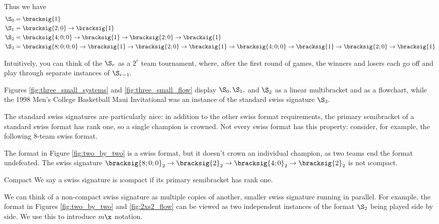 {    Thus we have
    \begin{align*}
        \S_0 =\; &\bracksig{1}\\
        \S_1 =\; &\bracksig{2;0} \to \bracksig{1}\\
        \S_2 =\; &\bracksig{4;0;0} \to \bracksig{1} \to \bracksig{2;0} \to \bracksig{1}\\
        \S_3 =\; &\bracksig{8;0;0;0} \to \bracksig{1} \to \bracksig{2;0} \to \bracksig{1} \to \bracksig{4;0;0} \to \bracksig{1} \to \bracksig{2;0} \to \bracksig{1}
    \end{align*}

    Intuitively, you can think of the $\S_r$ as a $2^r$ team tournament, where, after the first round of games, the winners and losers each go off and play through separate instances of $\S_{r-1}.$

    Figures \ref{fig:three_small_systems} and \ref{fig:three_small_flow} display $\S_0, \S_1,$ and $\S_2$ as a linear multibracket and as a flowchart, while the 1998 Men's College Basketball Maui Invitational was an instance of the standard swiss signature $\S_3.$


    The standard swiss signatures are particularly nice: in addition to the other swiss format requirements, the primary semibracket of a standard swiss format has rank one, so a single champion is crowned. Not every swiss format has this property: consider, for example, the following 8-team swiss format.

    

    The format in Figure \ref{fig:two_by_two} is a swiss format, but it doesn't crown an individual champion, as two teams end the format undefeated. The swiss signature $\bracksig{8;0;0}_2 \to \bracksig{2}_2 \to \bracksig{4;0}_2 \to \bracksig{2}_2$ is not \i{compact}.

   \begin{definition}{Compact}{}
        We say a swiss signature is \i{compact} if its primary semibracket has rank one.
   \end{definition}

    We can think of a non-compact swiss signature as multiple copies of another, smaller swiss signature running in parallel. For example, the format in Figures \ref{fig:two_by_two} and \ref{fig:2xs2_flow} can be viewed as two independent instances of the format $\S_2$ being played side by side. We use this to introduce $m\x$ notation.

}
